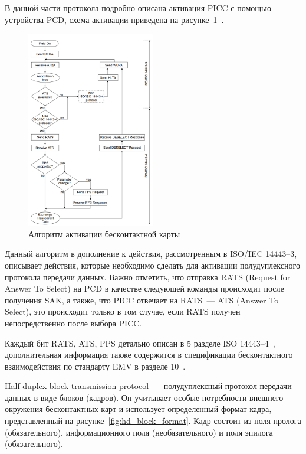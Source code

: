 В данной части протокола подробно описана активация PICC с помощью устройства PCD, схема активации приведена на рисунке~\ref{fig:pcd_flow_2_picc_activation}~\cite{iso14443-4}.

\begin{figure}[h]
    \centering
    \includegraphics[width=0.5\textwidth]{images/research/pcd_flow_2_picc_activation}
    \caption{\centering Алгоритм активации бесконтактной карты}
    \label{fig:pcd_flow_2_picc_activation}
\end{figure}

Данный алгоритм в дополнение к действия, рассмотренным в ISO/IEC 14443--3, описывает действия, которые необходимо сделать для активации полудуплексного протокола передачи данных.
Важно отметить, что отправка RATS (Request for Answer To Select) на PCD в качестве следующей команды происходит после получения SAK, а также, что PICC отвечает на RATS~--- ATS (Answer To Select), это происходит только в том случае, если RATS получен непосредственно после выбора PICC.

Каждый бит RATS, ATS, PPS детально описан в 5 разделе ISO 14443--4~\cite{iso14443-4}, дополнительная информация также содержится в спецификации бесконтактного взаимодействия по стандарту EMV в разделе 10~\cite{emv_specifications_book}.

Half-duplex block transmission protocol~--- полудуплексный протокол передачи данных в виде блоков (кадров).
Он учитывает особые потребности внешнего окружения бесконтактных карт и использует определенный формат кадра, представленный на рисунке~\ref{fig:hd_block_format}.
Кадр состоит из поля пролога (обязательного), информационного поля (необязательного) и поля эпилога (обязательного).

